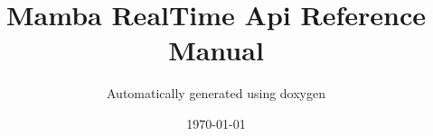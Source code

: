 \documentclass[a4paper,10pt,oneside]{article}
\title{Mamba RealTime Api Reference Manual}
\author{Automatically generated using doxygen}
\date\today
\begin{document}
\mambaCover
\mambaContent
\end{document}

